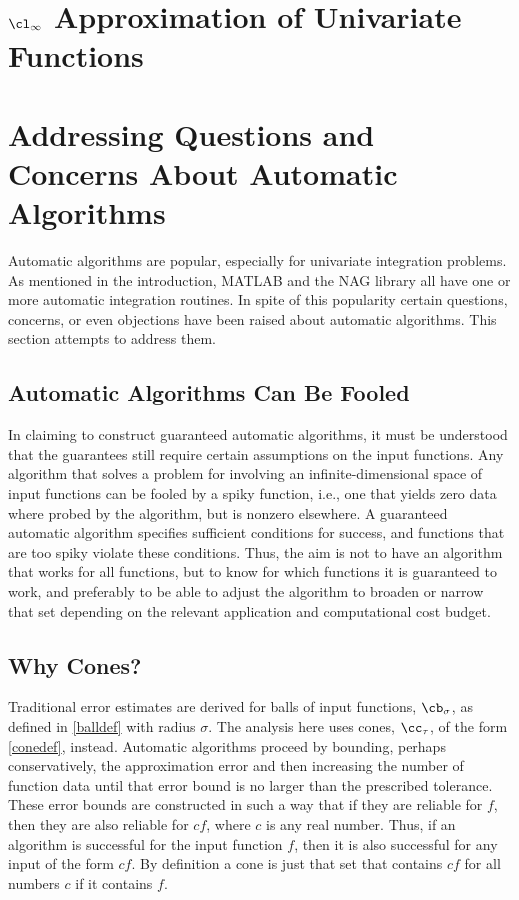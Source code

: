 \documentclass[]{elsarticle}
\theoremstyle{definition}
\theoremstyle{remark}
\begin{document}
\section{$\cl_{\infty}$ Approximation of Univariate Functions} \label{approxsec}



\section{Addressing Questions and Concerns About Automatic Algorithms} \label{overcomesec}

Automatic algorithms are popular, especially for univariate integration problems.  As mentioned in the introduction, MATLAB \cite{TrefEtal12,MAT7.12} and the NAG \cite{NAG23} library all have one or more automatic integration routines.  In spite of this popularity certain questions, concerns, or even objections have been raised about automatic algorithms.  This section attempts to address them.


\subsection{Automatic Algorithms Can Be Fooled}  

In claiming to construct guaranteed automatic algorithms, it must be understood that the guarantees still require certain assumptions on the input functions.  Any algorithm that solves a problem for involving an infinite-dimensional space of input functions can be fooled by a spiky function, i.e., one that yields zero data where probed by the algorithm, but is nonzero elsewhere.  A guaranteed automatic algorithm specifies sufficient conditions for success, and functions that are too spiky violate these conditions.  Thus, the aim is not to have an algorithm that works for all functions, but to know for which functions it is guaranteed to work, and preferably to be able to adjust the algorithm to broaden or narrow that set depending on the relevant application and computational cost budget.

\subsection{Why Cones?}

Traditional error estimates are derived for balls of input functions, $\cb_{\sigma}$, as defined in \eqref{balldef} with radius $\sigma$.  The analysis here uses cones, $\cc_{\tau}$, of the form \eqref{conedef}, instead.  Automatic algorithms proceed by bounding, perhaps conservatively, the approximation error and then increasing the number of function data until that error bound is no larger than the prescribed tolerance.  These error bounds are constructed in such a way that if they are reliable for $f$, then they are also reliable for $cf$, where $c$ is any real number.  Thus, if an algorithm is successful for the input function $f$, then it is also successful for any input of the form $cf$.  By definition a cone is just that set that contains $cf$ for all numbers $c$ if it contains $f$.
\end{document}
